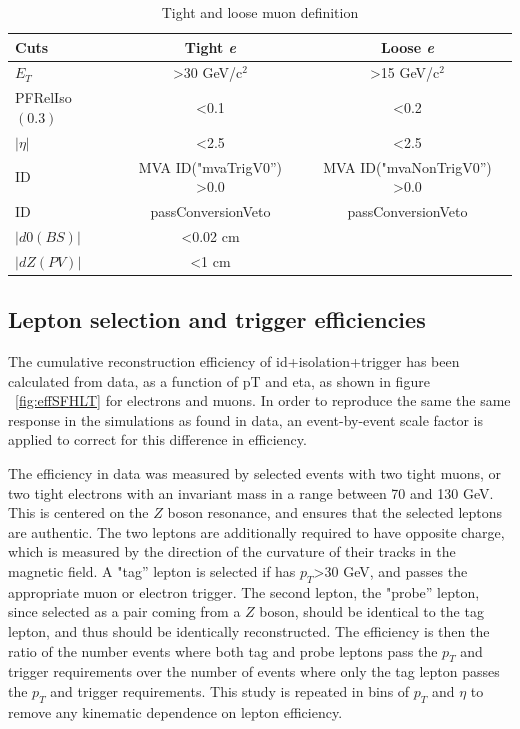 \begin{table}[hbtp]\footnotesize
\centering
\begin{tabular}{|l|c|c|}
\hline\hline
Cuts & Tight \emph{e} & Loose \emph{e} \\
\hline
$E_{T}$ & \textgreater 30 GeV/c$^2$ & \textgreater 15 GeV/c$^2$ \\
\hline
PFRelIso$(0.3)$ & \textless 0.1 & \textless 0.2 \\
\hline
$|\eta|$ & \textless 2.5 & \textless 2.5 \\
\hline
ID & MVA ID("mvaTrigV0'') \textgreater 0.0 &  MVA ID("mvaNonTrigV0'') \textgreater 0.0\\
\hline
ID & passConversionVeto & passConversionVeto \\
\hline
$|d0(BS)|$ & \textless 0.02 cm & \\
\hline
$|dZ(PV)|$ & \textless 1 cm & \\
\hline\hline
\end{tabular}
\caption{Tight and loose muon definition}
\label{tab:TightLooseEleTable}
\end{table}


\subsection{Lepton selection and trigger efficiencies}
\label{trigger_efficiency_overview}

\par The cumulative reconstruction efficiency of id+isolation+trigger
has been calculated from data, as a function of pT and eta, as
shown in figure ~\ref{fig:effSFHLT} for electrons and muons.  In order
to reproduce the same the same response in the simulations as found in
data, an event-by-event scale factor is applied to correct for this
difference in efficiency.  

\par The efficiency in data was measured by selected events with two
tight muons, or two tight electrons with an invariant mass in a range
between 70 and 130 GeV.  This is centered on the $Z$ boson resonance,
and ensures that the selected leptons are authentic.  The two leptons
are additionally required to have opposite charge, which is measured
by the direction of the curvature of their tracks in the magnetic
field.  A "tag'' lepton is selected if has $p_{T}$>30 GeV, and passes
the appropriate muon or electron trigger.  The second lepton, the
"probe'' lepton, since selected as a pair coming from a $Z$ boson,
should be identical to the tag lepton, and thus should be identically
reconstructed.  The efficiency is then the ratio of the number events where both
tag and probe leptons pass the $p_{T}$ and trigger requirements over
the number of events where only the tag lepton passes the $p_{T}$ and
trigger requirements.  This study is repeated in bins of $p_{T}$ and
$\eta$ to remove any kinematic dependence on lepton efficiency.  


